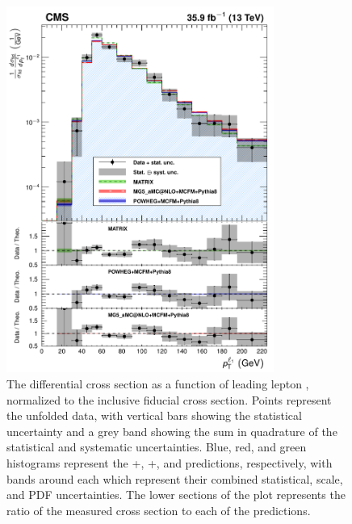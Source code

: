 \begin{figure}[htbp]
  \begin{center}
    \includegraphics[width=0.78\textwidth]{results/unfold_l1Pt.pdf}
    \caption[Normalized differential {\ZZ} cross section as a function of leading lepton {\pt}]{
        The {\ZZ} differential cross section as a function of leading lepton {\pt}, normalized to the inclusive fiducial cross section.
        Points represent the unfolded data, with vertical bars showing the statistical uncertainty and a grey band showing the sum in quadrature of the statistical and systematic uncertainties.
        Blue, red, and green histograms represent the {\POWHEG}+{\MCFM}, {\MGAMC}+{\MCFM}, and {\MATRIX} predictions, respectively, with bands around each which represent their combined statistical, scale, and PDF uncertainties.
        The lower sections of the plot represents the ratio of the measured cross section to each of the predictions.
      }\label{fig:unfold_l1Pt}
  \end{center}
\end{figure}

